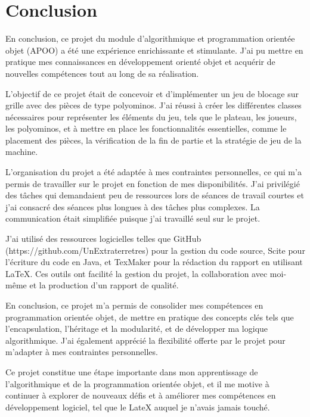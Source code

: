 \chapter*{Conclusion}

En conclusion, ce projet du module d'algorithmique et programmation orientée objet (APOO) a été une expérience enrichissante et stimulante. J'ai pu mettre en pratique mes connaissances en développement orienté objet et acquérir de nouvelles compétences tout au long de sa réalisation.

L'objectif de ce projet était de concevoir et d'implémenter un jeu de blocage sur grille avec des pièces de type polyominos. J'ai réussi à créer les différentes classes nécessaires pour représenter les éléments du jeu, tels que le plateau, les joueurs, les polyominos, et à mettre en place les fonctionnalités essentielles, comme le placement des pièces, la vérification de la fin de partie et la stratégie de jeu de la machine.

L'organisation du projet a été adaptée à mes contraintes personnelles, ce qui m'a permis de travailler sur le projet en fonction de mes disponibilités. J'ai privilégié des tâches qui demandaient peu de ressources lors de séances de travail courtes et j'ai consacré des séances plus longues à des tâches plus complexes. La communication était simplifiée puisque j'ai travaillé seul sur le projet.

J'ai utilisé des ressources logicielles telles que GitHub (https://github.com/UnExtraterretres) pour la gestion du code source, Scite pour l'écriture du code en Java, et TexMaker pour la rédaction du rapport en utilisant LaTeX. Ces outils ont facilité la gestion du projet, la collaboration avec moi-même et la production d'un rapport de qualité.

En conclusion, ce projet m'a permis de consolider mes compétences en programmation orientée objet, de mettre en pratique des concepts clés tels que l'encapsulation, l'héritage et la modularité, et de développer ma logique algorithmique. J'ai également apprécié la flexibilité offerte par le projet pour m'adapter à mes contraintes personnelles.

Ce projet constitue une étape importante dans mon apprentissage de l'algorithmique et de la programmation orientée objet, et il me motive à continuer à explorer de nouveaux défis et à améliorer mes compétences en développement logiciel, tel que le LateX auquel je n'avais jamais touché.
